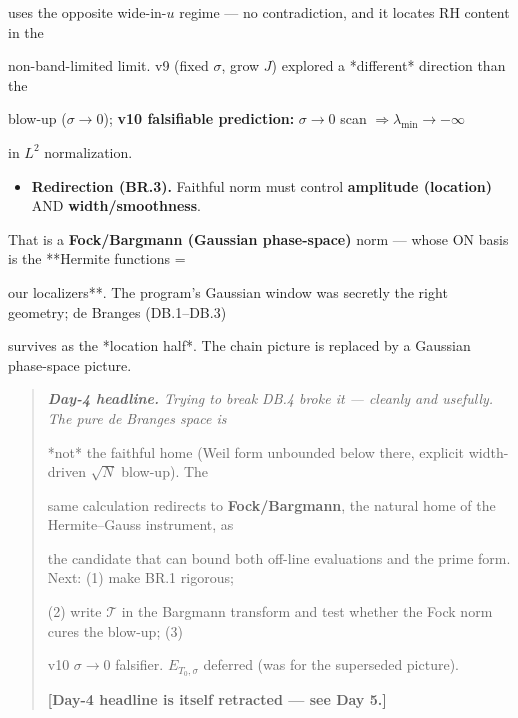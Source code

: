 \documentclass[10pt]{article}
\begin{document}
  uses the opposite wide-in-$u$ regime --- no contradiction, and it locates RH content in the\par
  non-band-limited limit. v9 (fixed $\sigma$, grow $J$) explored a *different* direction than the\par
  blow-up ($\sigma\to0$); \textbf{v10 falsifiable prediction:} $\sigma\to0$ scan $\Rightarrow\lambda_{\min}\to-\infty$\par
  in $L^2$ normalization.\par
\begin{itemize}
\item \textbf{Redirection (BR.3).} Faithful norm must control \textbf{amplitude (location)} AND \textbf{width/smoothness}.
\end{itemize}
  That is a \textbf{Fock/Bargmann (Gaussian phase-space)} norm --- whose ON basis is the **Hermite functions =\par
  our localizers**. The program's Gaussian window was secretly the right geometry; de Branges (DB.1--DB.3)\par
  survives as the *location half*. The chain picture is replaced by a Gaussian phase-space picture.\par

\begin{quote}\itshape
\textbf{Day-4 headline.} Trying to break DB.4 broke it --- cleanly and usefully. The pure de Branges space is\par
*not* the faithful home (Weil form unbounded below there, explicit width-driven $\sqrt N$ blow-up). The\par
same calculation redirects to \textbf{Fock/Bargmann}, the natural home of the Hermite--Gauss instrument, as\par
the candidate that can bound both off-line evaluations and the prime form. Next: (1) make BR.1 rigorous;\par
(2) write $\mathcal T$ in the Bargmann transform and test whether the Fock norm cures the blow-up; (3)\par
v10 $\sigma\to0$ falsifier. $E_{T_0,\sigma}$ deferred (was for the superseded picture).\par
\textbf{[Day-4 headline is itself retracted --- see Day 5.]}\par
\end{quote}
\end{document}
